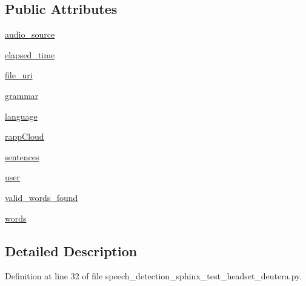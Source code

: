 \subsection*{Public Attributes}
\begin{DoxyCompactItemize}
\item 
\hyperlink{classspeech__detection__sphinx__test__headset__deutera_1_1RappInterfaceTest_a8d4bceac98e4712bb93131aa565a7693}{audio\-\_\-source}
\item 
\hyperlink{classspeech__detection__sphinx__test__headset__deutera_1_1RappInterfaceTest_acb0f6d5f25a2a9fea216ee8996947bf0}{elapsed\-\_\-time}
\item 
\hyperlink{classspeech__detection__sphinx__test__headset__deutera_1_1RappInterfaceTest_aa4d5840c42997eb9b990bc42a4291ce5}{file\-\_\-uri}
\item 
\hyperlink{classspeech__detection__sphinx__test__headset__deutera_1_1RappInterfaceTest_a1d1f218d46d04507417ef1c9f3d6cb20}{grammar}
\item 
\hyperlink{classspeech__detection__sphinx__test__headset__deutera_1_1RappInterfaceTest_ae028815bc91a238a14070096de06aa42}{language}
\item 
\hyperlink{classspeech__detection__sphinx__test__headset__deutera_1_1RappInterfaceTest_ac3b5bf02f5db46e3b4b216bb2f51593d}{rapp\-Cloud}
\item 
\hyperlink{classspeech__detection__sphinx__test__headset__deutera_1_1RappInterfaceTest_a6edaa4b83158b7f5db2588557b92d435}{sentences}
\item 
\hyperlink{classspeech__detection__sphinx__test__headset__deutera_1_1RappInterfaceTest_a686651c56a16be26e31073036f004afc}{user}
\item 
\hyperlink{classspeech__detection__sphinx__test__headset__deutera_1_1RappInterfaceTest_a1c088592f7ee524c21da75f82e4b2aa7}{valid\-\_\-words\-\_\-found}
\item 
\hyperlink{classspeech__detection__sphinx__test__headset__deutera_1_1RappInterfaceTest_aac5ddc4e5fdd85dc48e7f0c033dbdba6}{words}
\end{DoxyCompactItemize}


\subsection{Detailed Description}


Definition at line 32 of file speech\-\_\-detection\-\_\-sphinx\-\_\-test\-\_\-headset\-\_\-deutera.\-py.



